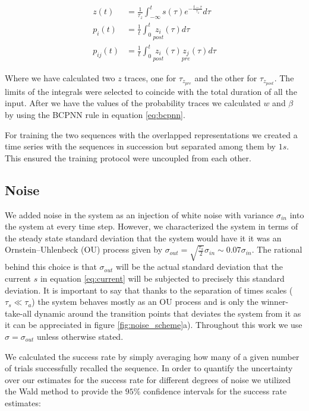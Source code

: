 \documentclass[10pt,a4paper]{article}
\begin{document}
\begin{align}
z(t) &= \frac{1}{\tau_z } \int_{-\infty}^{t} s(\tau) e^{-\frac{t - \tau}{\tau_z}} d\tau \label{eq:flitering}  \\
p_i(t) &= \frac{1}{t}\int_0^{t} \underset{post}{z_i}(\tau) d\tau  \label{eq:bcpnn_off_line_prob} \\
p_{ij}(t) &= \frac{1}{t}\int_0^{t} \underset{post}{z_i}(\tau) 
\underset{pre}{z_j}(\tau) d\tau \label{eq:bcpnn_off_line_joint} 
\end{align}

Where we have calculated two $z$ traces, one for $\tau_{z_{pre}}$ and the other for $\tau_{z_{post}}$. The limits of the integrals were selected to coincide with the total duration of all the input. After we have the values of the probability traces we calculated $w$ and $\beta$ by using the BCPNN rule in equation \ref{eq:bcpnn}.

For training the two sequences with the overlapped representations we created a time series with the sequences in succession but separated among them by $1s$. This ensured the training protocol were uncoupled from each other.



\subsection{Noise}
We added noise in the system as an injection of white noise with variance $\sigma_{in}$ into the system at every time step. However, we characterized the system in terms of the steady state standard deviation that the system would have it it was an Ornstein–Uhlenbeck (OU) process given by $\sigma_{out} = \sqrt{\frac{\tau_s}{2}} \sigma_{in} \sim 0.07 \sigma_{in}$. The rational behind this choice is that $\sigma_{out}$ will be the actual standard deviation that the current $s$ in equation \ref{eq:current} will be subjected to precisely this standard deviation. It is important to say that thanks to the separation of times scales ($\tau_s \ll \tau_a$) the system behaves mostly as an OU process and is only the winner-take-all dynamic around the transition points that deviates the system from it as it can be appreciated in figure \ref{fig:noise_scheme}a). Throughout this work we use $\sigma = \sigma_{out}$ unless otherwise stated. 

We calculated the success rate by simply averaging how many of a given number of trials successfully recalled the sequence. In order to quantify the uncertainty over our estimates for the success rate for different degrees of noise we utilized the Wald method to provide the $95 \% $ confidence intervals for the success rate estimates:
\end{document}
